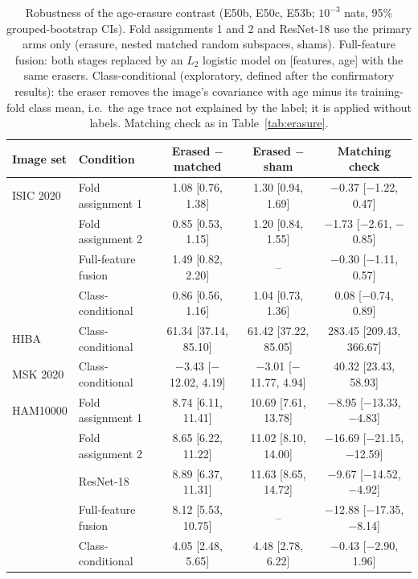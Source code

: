 \begin{table}[tp]\centering\footnotesize
\caption{Robustness of the age-erasure contrast (E50b, E50c, E53b; $10^{-3}$ nats, 95\% grouped-bootstrap CIs). Fold assignments 1 and 2 and ResNet-18 use the primary arms only (erasure, nested matched random subspaces, shams). Full-feature fusion: both stages replaced by an $L_2$ logistic model on [features, age] with the same erasers. Class-conditional (exploratory, defined after the confirmatory results): the eraser removes the image's covariance with age minus its training-fold class mean, i.e.\ the age trace not explained by the label; it is applied without labels. Matching check as in Table~\ref{tab:erasure}.}\label{tab:apperasurerob}
\setlength{\tabcolsep}{3pt}
\begin{tabular}{llccc}\toprule
Image set & Condition & Erased $-$ matched & Erased $-$ sham & Matching check\\\midrule
ISIC 2020 & Fold assignment 1 & 1.08 [0.76, 1.38] & 1.30 [0.94, 1.69] & \ensuremath{-}0.37 [\ensuremath{-}1.22, 0.47]\\
 & Fold assignment 2 & 0.85 [0.53, 1.15] & 1.20 [0.84, 1.55] & \ensuremath{-}1.73 [\ensuremath{-}2.61, \ensuremath{-}0.85]\\
 & Full-feature fusion & 1.49 [0.82, 2.20] & -- & \ensuremath{-}0.30 [\ensuremath{-}1.11, 0.57]\\
 & Class-conditional & 0.86 [0.56, 1.16] & 1.04 [0.73, 1.36] & 0.08 [\ensuremath{-}0.74, 0.89]\\
HIBA & Class-conditional & 61.34 [37.14, 85.10] & 61.42 [37.22, 85.05] & 283.45 [209.43, 366.67]\\
MSK 2020 & Class-conditional & \ensuremath{-}3.43 [\ensuremath{-}12.02, 4.19] & \ensuremath{-}3.01 [\ensuremath{-}11.77, 4.94] & 40.32 [23.43, 58.93]\\
HAM10000 & Fold assignment 1 & 8.74 [6.11, 11.41] & 10.69 [7.61, 13.78] & \ensuremath{-}8.95 [\ensuremath{-}13.33, \ensuremath{-}4.83]\\
 & Fold assignment 2 & 8.65 [6.22, 11.22] & 11.02 [8.10, 14.00] & \ensuremath{-}16.69 [\ensuremath{-}21.15, \ensuremath{-}12.59]\\
 & ResNet-18 & 8.89 [6.37, 11.31] & 11.63 [8.65, 14.72] & \ensuremath{-}9.67 [\ensuremath{-}14.52, \ensuremath{-}4.92]\\
 & Full-feature fusion & 8.12 [5.53, 10.75] & -- & \ensuremath{-}12.88 [\ensuremath{-}17.35, \ensuremath{-}8.14]\\
 & Class-conditional & 4.05 [2.48, 5.65] & 4.48 [2.78, 6.22] & \ensuremath{-}0.43 [\ensuremath{-}2.90, 1.96]\\

\end{tabular}
\end{table}
